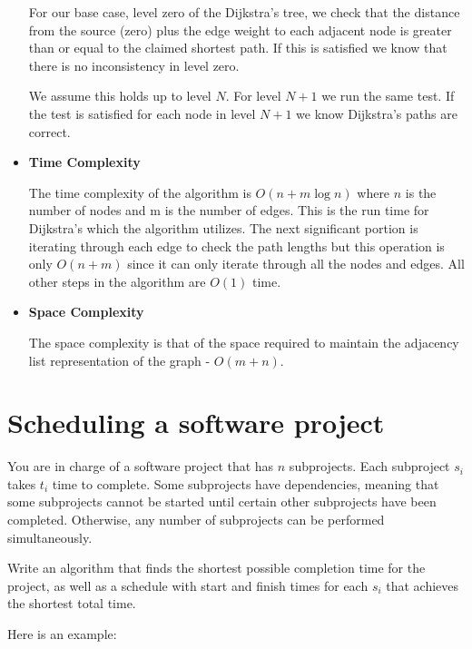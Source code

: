 \documentclass[letterpaper,11pt]{article}
\begin{document}
\begin{itemize}
        For our base case, level zero of the Dijkstra's tree, we check that the 
        distance from the source (zero) plus the edge weight to each adjacent node 
        is greater than or equal to the claimed shortest path. If this is satisfied
        we know that there is no inconsistency in level zero.

        We assume this holds up to level $N$. For level $N + 1$ we run the same
        test. If the test is satisfied for each node in level $N + 1 $ we know 
        Dijkstra's paths are correct. 

    \item \textbf{Time Complexity}
        
        The time complexity of the algorithm is $O\left( n + m\log{n} \right) $
        where $n$ is the number of nodes and m is the number of edges. 
        This is the run time for Dijkstra's which the algorithm utilizes. The 
        next significant portion is iterating through each edge to check 
        the path lengths but this operation is only $O\left( n + m \right) $ 
        since it can only iterate through all the nodes and edges. All other 
        steps in the algorithm are $O\left( 1 \right) $ time.

    \item \textbf{Space Complexity}

        The space complexity is that of the space required to maintain the adjacency
        list representation of the graph - $O\left( m + n \right) $.


\end{itemize}





\newpage
\section{Scheduling a software project}
You are in charge of a software project that has $n$ subprojects.  Each subproject $s_i$ takes $t_i$ time to complete.  Some subprojects have dependencies, meaning that some subprojects cannot be started until certain other subprojects have been completed.  Otherwise, any number of subprojects can be performed simultaneously.

Write an algorithm that finds the shortest possible completion time for the project, as well as a schedule with start and finish times for each $s_i$ that achieves the shortest total time.

Here is an example:
\end{document}
